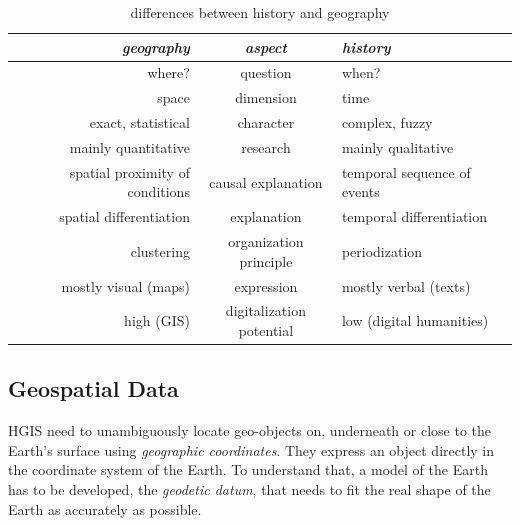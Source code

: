 \begin{table}[ht]
\begin{center}
\begin{tabular}{p{0px} r c l p{0px}}
    \toprule
    & \emph{geography}
    & \emph{aspect}
    & \emph{history}
    & \\
    \midrule
    & where?
    & question
    & when?
    & \\

    & space
    & dimension
    & time
    & \\

    & exact, statistical
    & character
    & complex, fuzzy
    & \\

    & mainly quantitative
    & research
    & mainly qualitative
    & \\

    & spatial proximity of conditions
    & causal explanation
    & temporal sequence of events
    & \\

    & spatial differentiation
    & explanation
    & temporal differentiation
    & \\

    & clustering
    & organization principle
    & periodization
    & \\

    & mostly visual (maps)
    & expression
    & mostly verbal (texts)
    & \\

    & high (GIS)
    & digitalization potential
    & low (digital humanities)
    & \\
    \bottomrule
\end{tabular}
\caption{differences between history and geography \cite[pp. 2-4]{knowles2008placing}}
\label{tab:history_vs_geography}
\end{center}
\end{table}


\newpage
\subsection{Geospatial Data} %
\label{sub:geospatial_data}

HGIS need to unambiguously locate geo-objects on, underneath or close to the Earth's surface using \emph{geographic coordinates}. They express an object directly in the coordinate system of the Earth. To understand that, a model of the Earth has to be developed, the \emph{geodetic datum}, that needs to fit the real shape of the Earth as accurately as possible.

